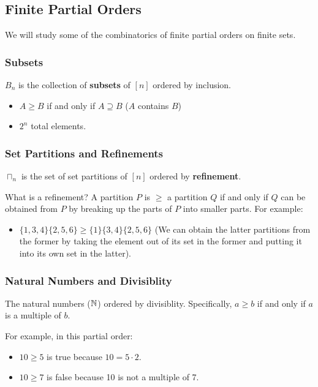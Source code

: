 \documentclass[letterpaper]{article}
\begin{document}
\subsection{Finite Partial Orders}
We will study some of the combinatorics of finite partial orders on finite sets. 

\subsubsection{Subsets}
$B_n$ is the collection of \textbf{subsets} of $[n]$ ordered by inclusion. 
\begin{itemize}
    \item $A \geq B$ if and only if $A \supseteq B$ ($A$ contains $B$)
    \item $2^n$ total elements. 
\end{itemize}

\subsubsection{Set Partitions and Refinements}
$\sqcap_n$ is the set of set partitions of $[n]$ ordered by \textbf{refinement}. 

\bigskip 

What is a refinement? A partition $P$ is $\geq$ a partition $Q$ if and only if $Q$ can be obtained from $P$ by breaking up the parts of $P$ into smaller parts. For example:
\begin{itemize}
    \item $\{1, 3, 4\}\{2, 5, 6\} \geq \{1\} \{3, 4\}\{2, 5, 6\}$ (We can obtain the latter partitions from the former by taking the element  out of its set in the former and putting it into its own set in the latter). 
\end{itemize}

\subsubsection{Natural Numbers and Divisiblity}
The natural numbers ($\mathbb{N}$) ordered by divisiblity. Specifically, $a \geq b$ if and only if $a$ is a multiple of $b$.

\bigskip 

For example, in this partial order:
\begin{itemize}
    \item $10 \geq 5$ is true because $10 = 5 \cdot 2$. 
    \item $10 \geq 7$ is false because 10 is not a multiple of 7.
\end{itemize}
\end{document}

